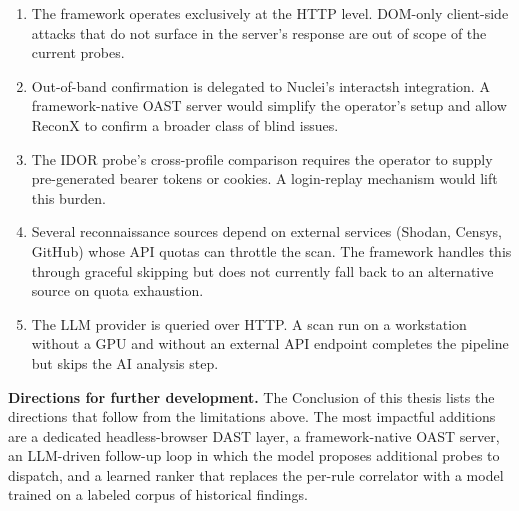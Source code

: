 \begin{enumerate}
  \item The framework operates exclusively at the HTTP level. DOM-only client-side attacks that do not surface in the server's response are out of scope of the current probes.
  \item Out-of-band confirmation is delegated to Nuclei's interactsh integration. A framework-native OAST server would simplify the operator's setup and allow ReconX to confirm a broader class of blind issues.
  \item The IDOR probe's cross-profile comparison requires the operator to supply pre-generated bearer tokens or cookies. A login-replay mechanism would lift this burden.
  \item Several reconnaissance sources depend on external services (Shodan, Censys, GitHub) whose API quotas can throttle the scan. The framework handles this through graceful skipping but does not currently fall back to an alternative source on quota exhaustion.
  \item The LLM provider is queried over HTTP. A scan run on a workstation without a GPU and without an external API endpoint completes the pipeline but skips the AI analysis step.
\end{enumerate}

\textbf{Directions for further development.} The Conclusion of this thesis lists the directions that follow from the limitations above. The most impactful additions are a dedicated headless-browser DAST layer, a framework-native OAST server, an LLM-driven follow-up loop in which the model proposes additional probes to dispatch, and a learned ranker that replaces the per-rule correlator with a model trained on a labeled corpus of historical findings.
